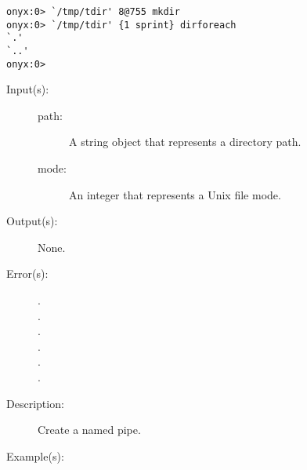\begin{description}
\begin{description}
\begin{verbatim}
onyx:0> `/tmp/tdir' 8@755 mkdir
onyx:0> `/tmp/tdir' {1 sprint} dirforeach
`.'
`..'
onyx:0>
		\end{verbatim}
	\end{description}
\label{systemdict:mkfifo}
\item[{\onyxop{path}{mkfifo}{--}}: ]
\item[{\onyxop{path mode}{mkfifo}{--}}: ]
	\begin{description}\item[]
	\item[Input(s): ]
		\begin{description}\item[]
		\item[path: ]
			A string object that represents a directory path.
		\item[mode: ]
			An integer that represents a Unix file mode.
		\end{description}
	\item[Output(s): ] None.
	\item[Error(s): ]
		\begin{description}\item[]
		\item[.]
		\item[.]
		\item[.]
		\item[.]
		\item[.]
		\item[.]
		\end{description}
	\item[Description: ]
		Create a named pipe.
	\item[Example(s): ]\begin{verbatim}


\end{verbatim}
\end{description}
\end{description}
